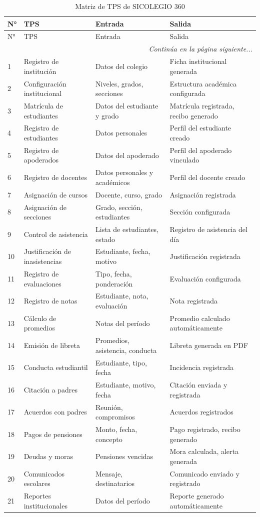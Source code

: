 \documentclass[12pt,a4paper,oneside]{report}
\begin{document}
\begin{longtable}{p{0.5cm}p{3.5cm}p{4.5cm}p{4.5cm}}
\caption{Matriz de TPS de SICOLEGIO 360}
\label{tab:tps}\\
\toprule
N° & TPS & Entrada & Salida \\
\midrule
\endfirsthead
\toprule
N° & TPS & Entrada & Salida \\
\midrule
\endhead
\midrule
\multicolumn{4}{r}{\textit{Continúa en la página siguiente...}}\\
\endfoot
\bottomrule
\endlastfoot

1 & Registro de institución & Datos del colegio & Ficha institucional generada \\
2 & Configuración institucional & Niveles, grados, secciones & Estructura académica configurada \\
3 & Matrícula de estudiantes & Datos del estudiante y grado & Matrícula registrada, recibo generado \\
4 & Registro de estudiantes & Datos personales & Perfil del estudiante creado \\
5 & Registro de apoderados & Datos del apoderado & Perfil del apoderado vinculado \\
6 & Registro de docentes & Datos personales y académicos & Perfil del docente creado \\
7 & Asignación de cursos & Docente, curso, grado & Asignación registrada \\
8 & Asignación de secciones & Grado, sección, estudiantes & Sección configurada \\
9 & Control de asistencia & Lista de estudiantes, estado & Registro de asistencia del día \\
10 & Justificación de inasistencias & Estudiante, fecha, motivo & Justificación registrada \\
11 & Registro de evaluaciones & Tipo, fecha, ponderación & Evaluación configurada \\
12 & Registro de notas & Estudiante, nota, evaluación & Nota registrada \\
13 & Cálculo de promedios & Notas del período & Promedio calculado automáticamente \\
14 & Emisión de libreta & Promedios, asistencia, conducta & Libreta generada en PDF \\
15 & Conducta estudiantil & Estudiante, tipo, fecha & Incidencia registrada \\
16 & Citación a padres & Estudiante, motivo, fecha & Citación enviada y registrada \\
17 & Acuerdos con padres & Reunión, compromisos & Acuerdos registrados \\
18 & Pagos de pensiones & Monto, fecha, concepto & Pago registrado, recibo generado \\
19 & Deudas y moras & Pensiones vencidas & Mora calculada, alerta generada \\
20 & Comunicados escolares & Mensaje, destinatarios & Comunicado enviado y registrado \\
21 & Reportes institucionales & Datos del período & Reporte generado automáticamente \\
\end{longtable}
\end{document}
